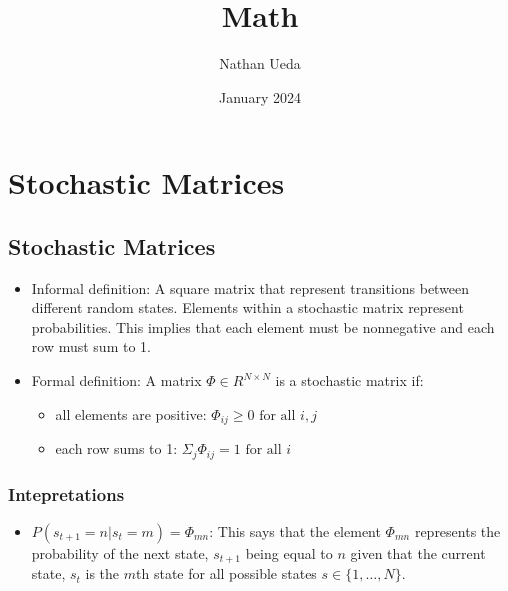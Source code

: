 \documentclass{article}
\title{Math}
\author{Nathan Ueda}
\date{January 2024}
\begin{document}
\maketitle

\section{Stochastic Matrices}
\subsection{Stochastic Matrices}
    \begin{itemize}
        \item Informal definition: A square matrix that represent 
        transitions between different random states. Elements within a 
        stochastic matrix represent probabilities. This implies that each 
        element must be nonnegative and each row must sum to 1.
        \item Formal definition: A matrix $ \Phi \in R^{N \times N} $ is a 
        stochastic matrix if:
        \begin{itemize}
            \item all elements are positive: $ \Phi_{ij} \ge 0 \text{ for 
            all } i,j $
            \item each row sums to 1: $ \Sigma_j \Phi_{ij} = 1 \text{ for 
            all } i $
        \end{itemize}
    \end{itemize}

\subsubsection{Intepretations}
\begin{itemize}
    \item $P(s_{t+1} = n | s_t = m) = \Phi_{mn} $: This says that the element
    $ \Phi_{mn} $ represents the probability of the next state, $ s_{t+1} $ 
    being equal to $ n $ given that the current state, $ s_t $ is the $ m $th 
    state for all possible states $ s \in \{1, \dots, N\} $.
\end{itemize}
\end{document}
